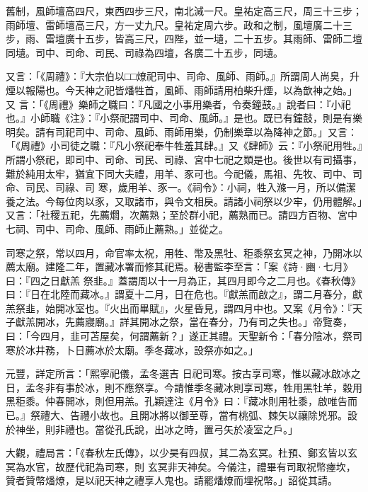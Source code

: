\begin{pinyinscope}
 舊制，風師壇高四尺，東西四步三尺，南北減一尺。皇祐定高三尺，周三十三步；雨師壇、雷師壇高三尺，方一丈九尺。皇祐定周六步。政和之制，風壇廣二十三步，雨、雷壇廣十五步，皆高三尺，四陛，並一壝，二十五步。其雨師、雷師二壇同壝。司中、司命、司民、司祿為四壇，各廣二十五步，同壝。



 又言：「《周禮》：『大宗伯以□□燎祀司中、司命、風師、雨師。』所謂周人尚臭，升煙以報陽也。今天神之祀皆燔牲首，風師、雨師請用柏柴升煙，以為歆神之始。」又
 言：「《周禮》樂師之職曰：『凡國之小事用樂者，令奏鐘鼓。』說者曰：『小祀也。』小師職《注》：『小祭祀謂司中、司命、風師。』是也。既已有鐘鼓，則是有樂明矣。請有司祀司中、司命、風師、雨師用樂，仍制樂章以為降神之節。」又言：「《周禮》小司徒之職：『凡小祭祀奉牛牲羞其肆。』又《肆師》云：『小祭祀用牲。』所謂小祭祀，即司中、司命、司民、司祿、宮中七祀之類是也。後世以有司攝事，難於純用太牢，猶宜下同大夫禮，用羊、豕可也。今祀儀，馬祖、先牧、司中、司命、司民、司祿、司
 寒，歲用羊、豕一。《祠令》：小祠，牲入滌一月，所以備潔養之法。今每位肉以豕，又取諸市，與令文相戾。請諸小祠祭以少牢，仍用體解。」又言：「社稷五祀，先薦爓，次薦熟；至於群小祀，薦熟而已。請四方百物、宮中七祠、司中、司命、風師、雨師止薦熟。」並從之。



 司寒之祭，常以四月，命官率太祝，用牲、幣及黑牡、秬黍祭玄冥之神，乃開冰以薦太廟。建隆二年，置藏冰署而修其祀焉。秘書監李至言：「案《詩·豳·七月》曰：『四之日獻羔
 祭韭。』蓋謂周以十一月為正，其四月即今之二月也。《春秋傳》曰：『日在北陸而藏冰。』謂夏十二月，日在危也。『獻羔而啟之』，謂二月春分，獻羔祭韭，始開冰室也。『火出而畢賦』，火星昏見，謂四月中也。又案《月令》：『天子獻羔開冰，先薦寢廟。』詳其開冰之祭，當在春分，乃有司之失也。」帝覽奏，曰：「今四月，韭可苫屋矣，何謂薦新？」遂正其禮。天聖新令：「春分陰冰，祭司寒於冰井務，卜日薦冰於太廟。季冬藏冰，設祭亦如之。」



 元豐，詳定所言：「熙寧祀儀，孟冬選吉
 日祀司寒。按古享司寒，惟以藏冰啟冰之日，孟冬非有事於冰，則不應祭享。今請惟季冬藏冰則享司寒，牲用黑牡羊，穀用黑秬黍。仲春開冰，則但用羔。孔穎達注《月令》曰：『藏冰則用牡黍，啟唯告而已。』祭禮大、告禮小故也。且開冰將以御至尊，當有桃弧、棘矢以禳除兇邪。設於神坐，則非禮也。當從孔氏說，出冰之時，置弓矢於凌室之戶。」



 大觀，禮局言：「《春秋左氏傳》，以少昊有四叔，其二為玄冥。杜預、鄭玄皆以玄冥為水官，故歷代祀為司寒，則
 玄冥非天神矣。今儀注，禮畢有司取祝幣瘞坎，贊者贊幣燔燎，是以祀天神之禮享人鬼也。請罷燔燎而埋祝幣。」詔從其請。




\end{pinyinscope}
